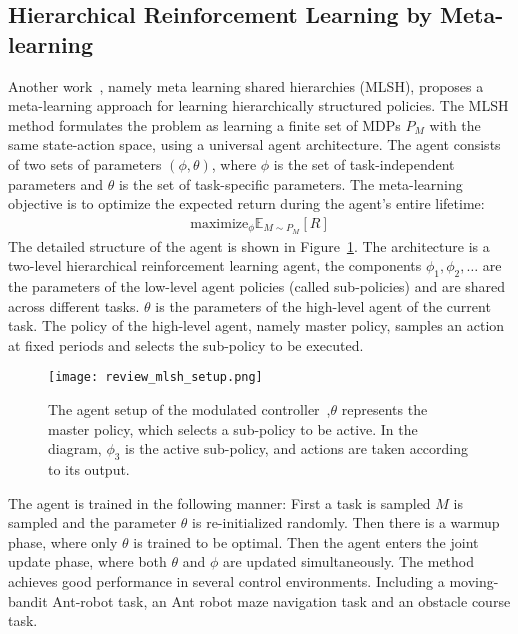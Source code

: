\subsection{Hierarchical Reinforcement Learning by Meta-learning}
Another work~\cite{frans2017meta}, namely meta learning shared hierarchies (MLSH), proposes a meta-learning approach for learning hierarchically structured policies.
The MLSH method formulates the problem as learning a finite set of MDPs $P_M$ with the same state-action space, using a universal agent architecture. The agent consists of two sets of parameters $(\phi,\theta)$, where $\phi$ is the set of task-independent parameters and $\theta$ is the set of task-specific parameters. The meta-learning objective is to optimize the expected return during the agent's entire lifetime:
\begin{align}
\mathrm{maximize}_\phi \mathbb{E}_{M\sim P_M}[R]
\end{align}
The detailed structure of the agent is shown in Figure~\ref{review_mlsh_arch}. The architecture is a two-level hierarchical reinforcement learning agent, the components $\phi_1,\phi_2,\dots$ are the parameters of the low-level agent policies (called sub-policies) and are shared across different tasks. $\theta$ is the parameters of the high-level agent of the current task. The policy of the high-level agent, namely master policy, samples an action at fixed periods and selects the sub-policy to be executed.
\begin{figure}[h]
	\texttt{[image: review\_mlsh\_setup.png]}
	\centering
	\caption{The agent setup of the modulated controller~\cite{frans2017meta},$\theta$ represents the master policy, which selects
		a sub-policy to be active. In the diagram, $\phi_3$ is the active sub-policy, and actions are taken according
		to its output.}\label{review_mlsh_arch}
\end{figure}
The agent is trained in the following manner: First a task is sampled $M$ is sampled and the parameter $\theta$ is re-initialized randomly. Then there is a warmup phase, where only $\theta$ is trained to be optimal. Then the agent enters the joint update phase, where both $\theta$ and $\phi$ are updated simultaneously.
The method achieves good performance in several control environments. Including a moving-bandit Ant-robot task, an Ant robot maze navigation task and an obstacle course task. 

